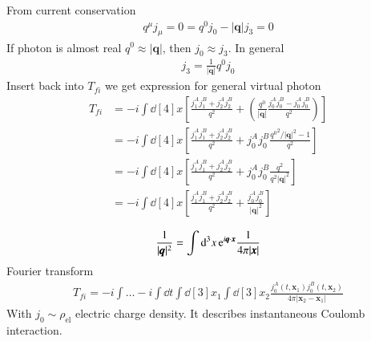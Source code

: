 From current conservation
\begin{align*}
   q^\mu j_\mu = 0 = q^0 j_0 - |\pmb{q}| j_3 = 0
\end{align*}
If photon is almost real $q^0 \approx |\pmb{q}|$, then $j_0 \approx j_3$. In general
\begin{align*}
   j_3 = \frac{1}{|\pmb{q}|} q^0 j_0
\end{align*}
Insert back into $T_{fi}$ we get expression for general virtual photon
\begin{align*}
   T_{fi} &= -i \int \dd[4]{x} \left[ \frac{j_1^A j_1^B + j_2^A j_2^B}{q^2} + \left( \frac{q^0}{|\pmb{q}|} \frac{j_0^A j_0^B - j_0^A j_0^B}{q^2} \right) \right] \\
          &= -i \int \dd[4]{x} \left[ \frac{j_1^A j_1^B + j_2^A j_2^B}{q^2} +  j_0^A j_0^B \frac{{q^0}^2 / |\pmb{q}|^2 - 1}{q^2} \right] \\
          &= -i \int \dd[4]{x} \left[ \frac{j_1^A j_1^B + j_2^A j_2^B}{q^2} +  j_0^A j_0^B \frac{q^2}{q^2 |\pmb{q}|^2 } \right] \\
          &= -i \int \dd[4]{x} \left[ \frac{j_1^A j_1^B + j_2^A j_2^B}{q^2} +  \frac{j_0^A j_0^B}{|\pmb{q}|^2}\right]
\end{align*}

\begin{align}
   \frac{1}{|\pmb{q}|^2} = \int \dd[3]{x} \mathrm{e}^{i \pmb{q} \cdot \pmb{x}} \frac{1}{4\pi |\pmb{x}|}
\end{align}
Fourier transform
\begin{align*}
   T_{fi} = -i \int \dots -i \int \dd{t} \int \dd[3]{x_1} \int \dd[3]{x_2} \frac{j_0^A(t,\pmb{x}_1) j_0^B(t, \pmb{x}_2)}{4\pi |\pmb{x}_2 - \pmb{x}_1|}
\end{align*}
With $j_0 \sim \rho_\text{el}$ electric charge density. It describes instantaneous Coulomb interaction.
